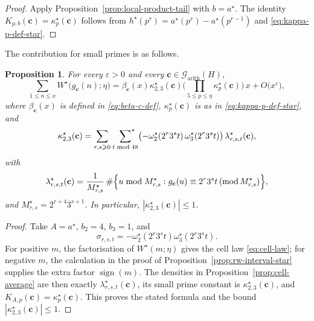 \documentclass[12pt,reqno]{amsart}
\numberwithin{equation}{section}
\newtheorem{proposition}[theorem]{Proposition}
\theoremstyle{definition}
\renewcommand{\le}{\leqslant}
\renewcommand{\ge}{\geqslant}
\newcommand{\sumstar}{\sideset{}{^*}\sum}
\newcommand{\cc}{\mathbf{c}}
\DeclareMathOperator{\sign}{sign}
\newcommand{\rw}{W}
\renewcommand{\pmod}[1]{\,(\mathrm{mod}\,#1)}
\begin{document}
\begin{proof}
Apply Proposition~\ref{prop:local-product-tail} with $b=a^\star$.
The identity $K_{p,b}(\cc)=\kappa_p^\star(\cc)$ follows from $h^\star(p^r)=a^\star(p^r)-a^\star(p^{r-1})$ and \eqref{eq:kappa-p-def-star}.
\end{proof}

The contribution for small primes is as follows.
\begin{proposition}\label{prop:asymp-star}
For every $\varepsilon>0$ and every $\cc\in \mathcal G_{\mathrm{arith}}(H)$,
\begin{equation*}
\sum_{1\le n\le x}\rw^\star\bigl(g_\cc(n); \eta\bigr)
=\beta_\cc(x)\kappa_{2,3}^\star(\cc)
\Bigg(\prod_{5\le p\le \eta}\kappa_p^\star(\cc)\Bigg)\,x
+O\bigl(x^{\varepsilon}\bigr),
\end{equation*}
where $\beta_\cc(x)$ is defined in \eqref{eq:beta-c-def}, $\kappa_p^\star(\cc)$ is as in \eqref{eq:kappa-p-def-star}, and
\begin{equation}\label{eq:kappa23-def-star}
\kappa_{2,3}^\star(\cc)
=\sum_{r,s\ge 0}\ \sumstar_{t\bmod48}
\bigl(-\omega_2^\star(2^{r}3^{s}t)\,\omega_3^\star(2^{r}3^{s}t)\bigr)\,
\lambda_{r,s,t}^\star(\cc),
\end{equation}
with
\[
\lambda_{r,s,t}^\star(\cc)
=\frac{1}{M_{r,s}^\star}\,
\#\Bigl\{u\bmod M_{r,s}^\star:
g_\cc(u)\equiv2^r3^s t\pmod{M_{r,s}^\star}\Bigr\},
\]
and $M_{r,s}^\star=2^{r+4}3^{s+1}$.
In particular, $|\kappa_{2,3}^\star(\cc)|\le 1$.
\end{proposition}
\begin{proof}
Take $A=a^\star$, $b_2=4$, $b_3=1$, and
\[
\sigma_{r,s,t}
=-\omega_2^\star(2^r3^s t)\omega_3^\star(2^r3^s t).
\]
For positive $m$, the factorisation of $\rw^\star(m;\eta)$ gives the cell law \eqref{eq:cell-law}; for negative $m$, the calculation in the proof of Proposition~\ref{prop:rw-interval-star} supplies the extra factor $\sign(m)$.
The densities in Proposition~\ref{prop:cell-average} are then exactly $\lambda_{r,s,t}^\star(\cc)$, its small prime constant is $\kappa_{2,3}^\star(\cc)$, and $K_{A,p}(\cc)=\kappa_p^\star(\cc)$.
This proves the stated formula and the bound $|\kappa_{2,3}^\star(\cc)|\le1$.
\end{proof}
\end{document}
